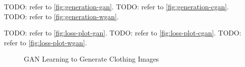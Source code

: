 \documentclass[conference]{IEEEtran}
\begin{document}
    TODO: refer to \autoref{fig:generation-gan}.
    TODO: refer to \autoref{fig:generation-cgan}.
    TODO: refer to \autoref{fig:generation-wgan}.

    TODO: refer to \autoref{fig:loss-plot-gan}.
    TODO: refer to \autoref{fig:loss-plot-cgan}.
    TODO: refer to \autoref{fig:loss-plot-wgan}.

    \begin{figure}
        \caption{GAN Learning to Generate Clothing Images}
        \label{fig:generation-gan}
        \centering
    \end{figure}
\end{document}
